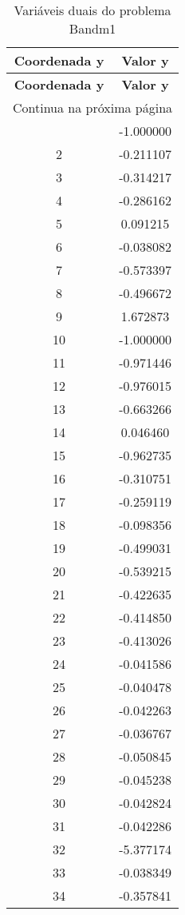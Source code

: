 \documentclass[12pt]{article}
\begin{document}
\begin{longtable}{@{}cc@{}}
\caption{Variáveis duais do problema Bandm1} \\
\toprule
\textbf{Coordenada y} & \textbf{Valor y} \\
\midrule
\endfirsthead

\toprule
\textbf{Coordenada y} & \textbf{Valor y} \\
\midrule
\endhead

\midrule \multicolumn{2}{r}{{Continua na próxima página}} \\ \midrule
\endfoot

\bottomrule
\endlastfoot
1 & -1.000000 \\
2 & -0.211107 \\
3 & -0.314217 \\
4 & -0.286162 \\
5 & 0.091215 \\
6 & -0.038082 \\
7 & -0.573397 \\
8 & -0.496672 \\
9 & 1.672873 \\
10 & -1.000000 \\
11 & -0.971446 \\
12 & -0.976015 \\
13 & -0.663266 \\
14 & 0.046460 \\
15 & -0.962735 \\
16 & -0.310751 \\
17 & -0.259119 \\
18 & -0.098356 \\
19 & -0.499031 \\
20 & -0.539215 \\
21 & -0.422635 \\
22 & -0.414850 \\
23 & -0.413026 \\
24 & -0.041586 \\
25 & -0.040478 \\
26 & -0.042263 \\
27 & -0.036767 \\
28 & -0.050845 \\
29 & -0.045238 \\
30 & -0.042824 \\
31 & -0.042286 \\
32 & -5.377174 \\
33 & -0.038349 \\
34 & -0.357841 \\

\end{longtable}
\end{document}
